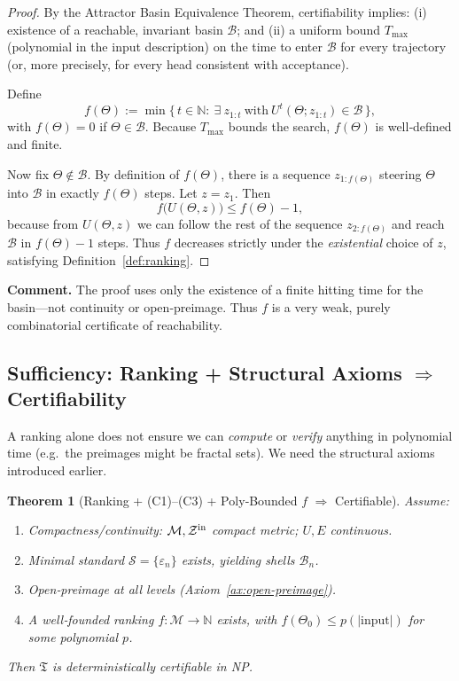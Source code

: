 \documentclass[12pt]{article}
\theoremstyle{definition}
\theoremstyle{plain}
\newtheorem{theorem}{Theorem}[section]
\begin{document}
\begin{proof}
By the Attractor Basin Equivalence Theorem, certifiability implies:
(i) existence of a reachable, invariant basin $\mathcal B$; and
(ii) a uniform bound $T_{\max}$ (polynomial in the input description) on the time to enter $\mathcal B$ for every trajectory (or, more precisely, for every head consistent with acceptance).

Define
\[
  f(\Theta) 
  := \min\bigl\{\,t\in\mathbb N:\ \exists\ z_{1:t}\ \text{with}\ U^t(\Theta;z_{1:t})\in\mathcal B\,\bigr\},
\]
with $f(\Theta)=0$ if $\Theta\in\mathcal B$.  Because $T_{\max}$ bounds the search, $f(\Theta)$ is well‑defined and finite.

Now fix $\Theta\notin\mathcal B$.  By definition of $f(\Theta)$, there is a sequence $z_{1:f(\Theta)}$ steering $\Theta$ into $\mathcal B$ in exactly $f(\Theta)$ steps.  Let $z=z_1$.  Then
\[
  f\bigl(U(\Theta,z)\bigr) \le f(\Theta)-1,
\]
because from $U(\Theta,z)$ we can follow the rest of the sequence $z_{2:f(\Theta)}$ and reach $\mathcal B$ in $f(\Theta)-1$ steps.  Thus $f$ decreases strictly under the \emph{existential} choice of $z$, satisfying Definition~\ref{def:ranking}.
\end{proof}

\noindent\textbf{Comment.}  
The proof uses only the existence of a finite hitting time for the basin—not continuity or open‑preimage.  Thus $f$ is a very weak, purely combinatorial certificate of reachability.

\subsection{Sufficiency: Ranking + Structural Axioms $\Rightarrow$ Certifiability}
\label{subsec:ranking-sufficient}

A ranking alone does not ensure we can \emph{compute} or \emph{verify} anything in polynomial time (e.g.\ the preimages might be fractal sets).  We need the structural axioms introduced earlier.

\begin{theorem}[Ranking + (C1)–(C3) + Poly‑Bounded $f$ $\Rightarrow$ Certifiable]
\label{thm:ranking-sufficient}
Assume:
\begin{enumerate}[label=(C\arabic*)]
  \item Compactness/continuity: $\mathcal M,\mathcal Z^{\rm in}$ compact metric; $U,E$ continuous.
  \item Minimal standard $\mathcal S=\{\varepsilon_n\}$ exists, yielding shells $\mathcal B_n$.
  \item Open‑preimage at all levels (Axiom~\ref{ax:open-preimage}).
  \item A well‑founded ranking $f:\mathcal M\to\mathbb N$ exists, with $f(\Theta_0)\le p(|\text{input}|)$ for some polynomial $p$.
\end{enumerate}
Then $\mathfrak T$ is deterministically certifiable in NP.
\end{theorem}
\end{document}
